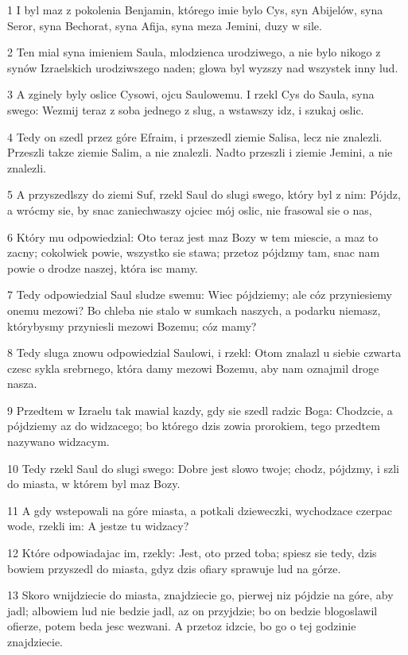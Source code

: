 \par 1 I byl maz z pokolenia Benjamin, którego imie bylo Cys, syn Abijelów, syna Seror, syna Bechorat, syna Afija, syna meza Jemini, duzy w sile.
\par 2 Ten mial syna imieniem Saula, mlodzienca urodziwego, a nie bylo nikogo z synów Izraelskich urodziwszego naden; glowa byl wyzszy nad wszystek inny lud.
\par 3 A zginely byly oslice Cysowi, ojcu Saulowemu. I rzekl Cys do Saula, syna swego: Wezmij teraz z soba jednego z slug, a wstawszy idz, i szukaj oslic.
\par 4 Tedy on szedl przez góre Efraim, i przeszedl ziemie Salisa, lecz nie znalezli. Przeszli takze ziemie Salim, a nie znalezli. Nadto przeszli i ziemie Jemini, a nie znalezli.
\par 5 A przyszedlszy do ziemi Suf, rzekl Saul do slugi swego, który byl z nim: Pójdz, a wrócmy sie, by snac zaniechwaszy ojciec mój oslic, nie frasowal sie o nas,
\par 6 Który mu odpowiedzial: Oto teraz jest maz Bozy w tem miescie, a maz to zacny; cokolwiek powie, wszystko sie stawa; przetoz pójdzmy tam, snac nam powie o drodze naszej, która isc mamy.
\par 7 Tedy odpowiedzial Saul sludze swemu: Wiec pójdziemy; ale cóz przyniesiemy onemu mezowi? Bo chleba nie stalo w sumkach naszych, a podarku niemasz, którybysmy przyniesli mezowi Bozemu; cóz mamy?
\par 8 Tedy sluga znowu odpowiedzial Saulowi, i rzekl: Otom znalazl u siebie czwarta czesc sykla srebrnego, która damy mezowi Bozemu, aby nam oznajmil droge nasza.
\par 9 Przedtem w Izraelu tak mawial kazdy, gdy sie szedl radzic Boga: Chodzcie, a pójdziemy az do widzacego; bo którego dzis zowia prorokiem, tego przedtem nazywano widzacym.
\par 10 Tedy rzekl Saul do slugi swego: Dobre jest slowo twoje; chodz, pójdzmy, i szli do miasta, w którem byl maz Bozy.
\par 11 A gdy wstepowali na góre miasta, a potkali dzieweczki, wychodzace czerpac wode, rzekli im: A jestze tu widzacy?
\par 12 Które odpowiadajac im, rzekly: Jest, oto przed toba; spiesz sie tedy, dzis bowiem przyszedl do miasta, gdyz dzis ofiary sprawuje lud na górze.
\par 13 Skoro wnijdziecie do miasta, znajdziecie go, pierwej niz pójdzie na góre, aby jadl; albowiem lud nie bedzie jadl, az on przyjdzie; bo on bedzie blogoslawil ofierze, potem beda jesc wezwani. A przetoz idzcie, bo go o tej godzinie znajdziecie.
